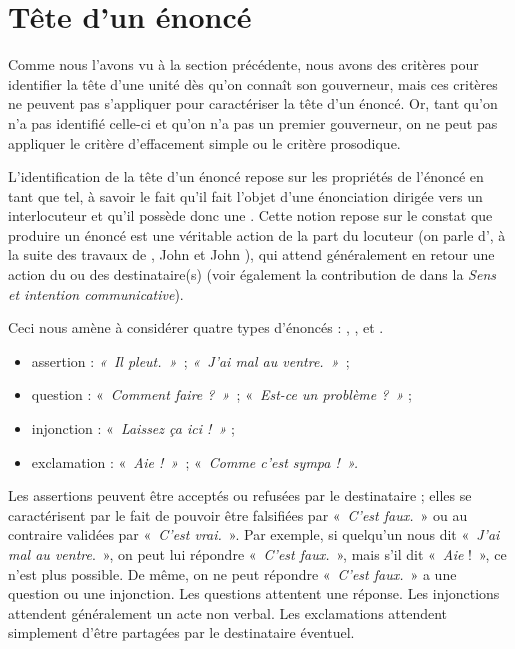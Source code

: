 \section{Tête d’un énoncé}\label{sec:3.3.8}

Comme nous l’avons vu à la section précédente, nous avons des critères pour identifier la tête d’une unité dès qu’on connaît son gouverneur, mais ces critères ne peuvent pas s’appliquer pour caractériser la tête d’un énoncé. Or, tant qu’on n’a pas identifié celle-ci et qu’on n’a pas un premier gouverneur, on ne peut pas appliquer le critère d’effacement simple ou le critère prosodique.

L’identification de la tête d’un énoncé repose sur les propriétés de l’énoncé en tant que tel, à savoir le fait qu’il fait l’objet d’une énonciation dirigée vers un interlocuteur et qu’il possède donc une . Cette notion repose sur le constat que produire un énoncé est une véritable action de la part du locuteur (on parle d’, à la suite des travaux de \citet{gardiner1932speech}, John \citet{austin1962how} et John \citet{searle1969speech}), qui attend généralement en retour une action du ou des destinataire(s) (voir également la contribution de \citet{bloomfield1933language} dans la  \textit{Sens et intention communicative}).

Ceci nous amène à considérer quatre types d’énoncés : , ,  et .

\begin{itemize}
\item assertion : \textit{«~Il pleut.~»~}; \textit{«~J’ai mal au ventre.~»~};
\item question : «~\textit{Comment faire ?~»~}; «~\textit{Est-ce un problème ?~»} ;
\item injonction : «~\textit{Laissez ça ici !~»} ;
\item exclamation : «~\textit{Aie !~»~}; «~\textit{Comme c’est sympa !~».}
\end{itemize}

Les assertions peuvent être acceptés ou refusées par le destinataire ; elles se caractérisent par le fait de pouvoir être falsifiées par «~\textit{C’est faux.}~» ou au contraire validées par «~\textit{C’est vrai.}~». Par exemple, si quelqu’un nous dit «~\textit{J’ai mal au ventre}.~», on peut lui répondre «~\textit{C’est faux.}~», mais s’il dit «~\textit{Aie} !~», ce n’est plus possible. De même, on ne peut répondre «~\textit{C’est faux.}~» a une question ou une injonction. Les questions attentent une réponse. Les injonctions attendent généralement un acte non verbal. Les exclamations attendent simplement d’être partagées par le destinataire éventuel.

